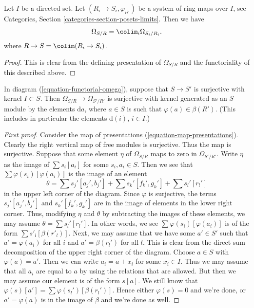 \begin{lemma}
\label{lemma-colimit-differentials}
Let $I$ be a directed set.
Let $(R_i \to S_i, \varphi_{ii'})$ be a system of
ring maps over $I$, see
Categories, Section \ref{categories-section-posets-limits}.
Then we have
$$
\Omega_{S/R} =
\colim_i \Omega_{S_i/R_i}.
$$
where $R \to S = \colim (R_i \to S_i)$.
\end{lemma}

\begin{proof}
This is clear from the defining presentation of $\Omega_{S/R}$
and the functoriality of this described above.
\end{proof}

\begin{lemma}
\label{lemma-differential-surjective}
In diagram (\ref{equation-functorial-omega}), suppose
that $S \to S'$ is surjective with kernel $I \subset S$.
Then $\Omega_{S/R} \to \Omega_{S'/R'}$ is surjective with
kernel generated as an $S$-module by the elements
$\text{d}a$, where $a \in S$ is such that $\varphi(a) \in \beta(R')$.
(This includes in particular the elements $\text{d}(i)$, $i \in I$.)
\end{lemma}

\begin{proof}[First proof]
Consider the map of presentations (\ref{equation-map-presentations}).
Clearly the right vertical
map of free modules is surjective. Thus the map is surjective.
Suppose that some element $\eta$ of $\Omega_{S/R}$ maps to zero in
$\Omega_{S'/R'}$. Write $\eta$ as the image of $\sum s_i[a_i]$ for some
$s_i, a_i \in S$. Then we see that $\sum \varphi(s_i)[\varphi(a_i)]$
is the image of an element
$$
\theta = \sum s_j'[a_j', b_j'] + \sum s_k'[f_k', g_k'] + \sum s_l'[r_l']
$$
in the upper left corner of the diagram.
Since $\varphi$ is surjective, the terms
$s_j'[a_j', b_j']$ and $s_k'[f_k', g_k']$ are in the image
of elements in the lower right corner. Thus, modifying
$\eta$ and $\theta$ by subtracting the images of these
elements, we may assume $\theta = \sum s_l'[r_l']$.
In other words, we see $\sum \varphi(s_i)[\varphi(a_i)]$ is of the form
$\sum s'_l [\beta(r'_l)]$.
Next, we may assume that we have some $a' \in S'$
such that $a' = \varphi(a_i)$ for all $i$ and $a' = \beta(r_l')$
for all $l$. This is clear from the direct sum decomposition
of the upper right corner of the diagram. Choose $a \in S$ with
$\varphi(a) = a'$. Then we can write $a_i = a + x_i$
for some $x_i \in I$. Thus we may assume that all $a_i$ are equal to
$a$ by using the relations that are allowed. But then we may
assume our element is of the form $s[a]$. We still know that
$\varphi(s)[a'] = \sum \varphi(s_l')[\beta(r_l')]$.
Hence either $\varphi(s) = 0$ and we're done, or
$a' = \varphi(a)$ is in the image of $\beta$ and we're done as well.
\end{proof}

